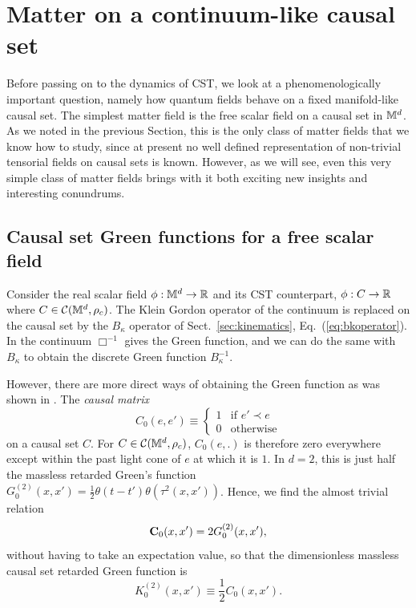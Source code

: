\section{Matter on a continuum-like causal set}
\label{sec:matter}


Before passing on to the dynamics of CST, we look at a phenomenologically important question, namely how quantum fields
behave on a fixed manifold-like causal set.   The simplest matter field  is the free scalar field on a
causal set in $\mathbb M^d$.  As we noted in the previous Section, this is the only class of matter fields that
we know how to study, since at present no well defined representation of non-trivial tensorial fields on causal sets is
known. However, as we will see, even this very simple class of matter fields  brings with it both exciting new insights and
interesting conundrums.  

\subsection{Causal set Green functions for a free scalar field } 
\label{ssec:Green} 
Consider the real scalar field $\phi: \mathbb M^d \rightarrow \mathbb R$ and its CST counterpart,    $\phi:C \rightarrow
\mathbb R$  where $C \in \mathcal C(\mathbb M^d,\rho_c)$. The Klein Gordon  operator of the continuum is replaced on the causal set by the $B_\kappa$ operator
of Sect.~\ref{sec:kinematics}, Eq.~(\ref{eq:bkoperator}).   In the continuum $\Box^{-1}$ gives the Green function, and we can do
the same with $B_\kappa$ to obtain the discrete Green function $B_\kappa^{-1}$.

However, there are more direct ways of obtaining the Green function
as was shown in \cite{daughton,salgado,johnston,dsx}.  The \emph{causal matrix} 
\begin{equation}
C_0(e,e') \equiv
\left\{
        \begin{array}{ll}
                1  & \mbox{if } e' \prec e \\
                0 & \mbox{} \mathrm{otherwise}
        \end{array}
\right.
\end{equation}
on a causal set $C$.    For $C \in \mathcal C(\mathbb M^d,\rho_c)$,  $C_0(e,.)$ is therefore zero everywhere except within  the past light cone of $e$ at
which it is $1$.  In $d=2$, this is just half the massless retarded Green's function $G^{(2)}_0(x,x') =\frac{1}{2}
\theta(t-t') \theta(\tau^2(x,x'))$.  Hence, we find the almost trivial relation  
\begin{equation} 
\mathbf C_0(x,x') = 2 G^{(2)}_0(x,x'), 
\end{equation} 
without having to take an expectation value, so that  the  dimensionless  massless causal set retarded Green
function is  \citep{daughton}  
\begin{equation}
\label{massless2d}
K^{(2)}_0(x,x')\equiv  \frac{1}{2}C_0(x,x').
\end{equation}

